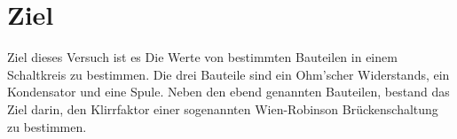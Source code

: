 \section{Ziel}
\label{sec:Ziel}
Ziel dieses Versuch ist es Die Werte von bestimmten Bauteilen in einem Schaltkreis zu bestimmen. Die drei Bauteile sind ein Ohm'scher Widerstands, ein Kondensator
und eine Spule. Neben den ebend genannten Bauteilen, bestand das Ziel darin, den Klirrfaktor einer sogenannten Wien-Robinson Brückenschaltung zu bestimmen.
